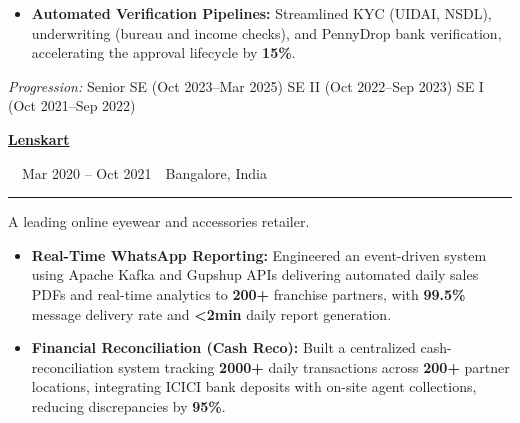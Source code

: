 \documentclass[a4paper,11pt]{article}
\newcommand{\cventry}[5]{%
  \vspace{2pt}
  {\large\color{accent}\bfseries\href{#2}{#1}}\par
  \vspace{1pt}
  \hspace{2em}{\bfseries #3}~\textbar~{\small #4}~\textbar~{\small #5}\par
  \vspace{1pt}
  {\color{pillborder}\rule{\linewidth}{0.7pt}}\par
  \vspace{1pt}
}
\begin{document}
\begin{minipage}[t]{0.62\textwidth}
\begin{itemize}
  \item \textbf{Automated Verification Pipelines:} Streamlined KYC (UIDAI, NSDL), underwriting (bureau and income checks), and PennyDrop bank verification, accelerating the approval lifecycle by \textbf{15\%}.
\end{itemize}
\vspace{2pt}
{\small\itshape Progression:} {\small Senior SE (Oct 2023--Mar 2025) \textbullet{} SE II (Oct 2022--Sep 2023) \textbullet{} SE I (Oct 2021--Sep 2022)}\par

\vspace{3pt}
\cventry{Lenskart}{https://www.lenskart.com}{Software Engineer}{Mar 2020 -- Oct 2021}{Bangalore, India}
{\small A leading online eyewear and accessories retailer.}
\vspace{2pt}
\begin{itemize}
  \setlength{\baselineskip}{12pt}
  \item \textbf{Real-Time WhatsApp Reporting:} Engineered an event-driven system using Apache Kafka and Gupshup APIs delivering automated daily sales PDFs and real-time analytics to \textbf{200+} franchise partners, with \textbf{99.5\%} message delivery rate and \textbf{<2min} daily report generation.
  \item \textbf{Financial Reconciliation (Cash Reco):} Built a centralized cash-reconciliation system tracking \textbf{2000+} daily transactions across \textbf{200+} partner locations, integrating ICICI bank deposits with on-site agent collections, reducing discrepancies by \textbf{95\%}.
\end{itemize}

\end{minipage}%
\hfill
\end{document}
